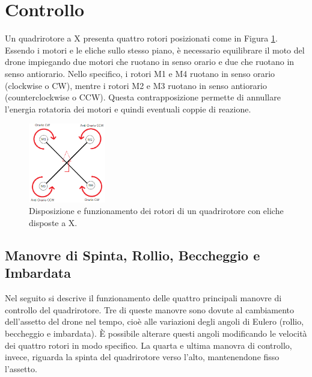 
\section{Controllo}
Un quadrirotore a X presenta quattro rotori posizionati come in Figura \ref{fig:quadRotors}. Essendo i motori e le eliche sullo stesso piano, è necessario equilibrare il moto del drone impiegando due motori che ruotano in senso orario e due che ruotano in senso antiorario. Nello specifico, i rotori M1 e M4 ruotano in senso orario (clockwise o CW), mentre i rotori M2 e M3 ruotano in senso antiorario (counterclockwise o CCW). Questa contrapposizione permette di annullare l'energia rotatoria dei motori e quindi eventuali coppie di reazione.

\begin{figure}[H]
    \centering
    \includegraphics[width=0.3\textwidth]{gfx/rotori_quadrotor}
    \caption[Disposizione e funzionamento dei rotori di un quadrirotore con eliche disposte a X.]{Disposizione e funzionamento dei rotori di un quadrirotore con eliche disposte a X.}
    \label{fig:quadRotors}
\end{figure}

\subsection{Manovre di Spinta, Rollio, Beccheggio e Imbardata}

Nel seguito si descrive il funzionamento delle quattro principali manovre di controllo del quadrirotore. Tre di queste manovre sono dovute al cambiamento dell'assetto del drone nel tempo, cioè alle variazioni degli angoli di Eulero (rollio, beccheggio e imbardata). È possibile alterare questi angoli modificando le velocità dei quattro rotori in modo specifico. La quarta e ultima manovra di controllo, invece, riguarda la spinta del quadrirotore verso l'alto, mantenendone fisso l'assetto.

